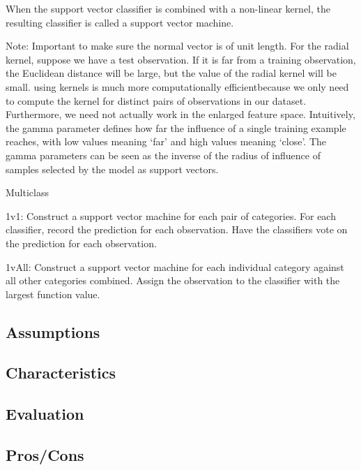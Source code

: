 \documentclass[]{book}
\begin{document}
When the support vector classifier is combined with a non-linear kernel, the resulting classifier is called a support vector machine.

Note: Important to make sure the normal vector is of unit length. For the radial kernel, suppose we have a test observation. If it is far from a training observation, the Euclidean distance will be large, but the value of the radial kernel will be small. using kernels is much more computationally efficientbecause we only need to compute the kernel for distinct pairs of observations in our dataset. Furthermore, we need not actually work in the enlarged feature space. Intuitively, the gamma parameter defines how far the influence of a single training example reaches, with low values meaning `far' and high values meaning `close'. The gamma parameters can be seen as the inverse of the radius of influence of samples selected by the model as support vectors.

Multiclass

1v1: Construct a support vector machine for each pair of categories. For each classifier, record the prediction for each observation. Have the classifiers vote on the prediction for each observation.

1vAll: Construct a support vector machine for each individual category against all other categories combined. Assign the observation to the classifier with the largest function value.

\hypertarget{assumptions-4}{%
\subsection{Assumptions}\label{assumptions-4}}

\hypertarget{characteristics-3}{%
\subsection{Characteristics}\label{characteristics-3}}

\hypertarget{evaluation-4}{%
\subsection{Evaluation}\label{evaluation-4}}

\hypertarget{proscons-4}{%
\subsection{Pros/Cons}\label{proscons-4}}
\end{document}
